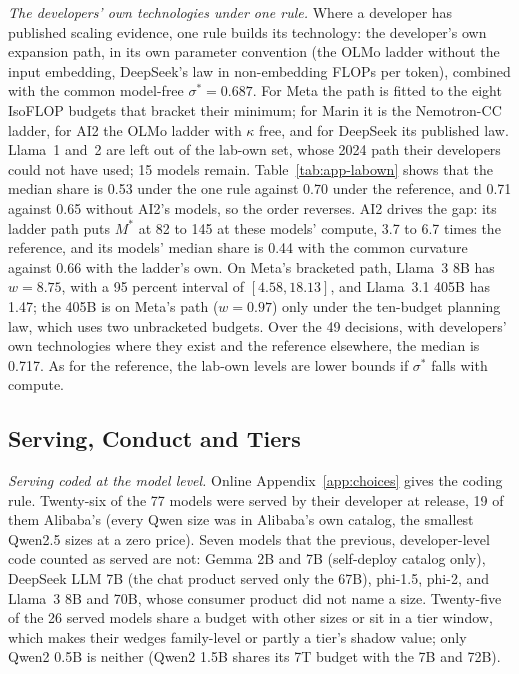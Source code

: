 \textit{The developers' own technologies under one rule.} Where a developer has published scaling evidence, one rule
builds its technology: the developer's own expansion path, in its own parameter convention (the OLMo ladder without the
input embedding, DeepSeek's law in non-embedding FLOPs per token), combined with the common model-free $\sigma^*=0.687$.
For Meta the path is fitted to the eight IsoFLOP budgets that bracket their minimum; for Marin it is the Nemotron-CC
ladder, for AI2 the OLMo ladder with $\kappa$ free, and for DeepSeek its published law. Llama~1 and~2 are left out of the
lab-own set, whose 2024 path their developers could not have used; 15 models remain. Table~\ref{tab:app-labown} shows that
the median share is 0.53 under the one rule against 0.70 under the reference, and 0.71 against 0.65 without AI2's models,
so the order reverses. AI2 drives the gap: its ladder path puts $M^*$ at 82 to 145 at these models' compute, 3.7 to 6.7
times the reference, and its models' median share is 0.44 with the common curvature against 0.66 with the ladder's own.
On Meta's bracketed path, Llama~3 8B has $w=8.75$, with a 95 percent interval of $[4.58,18.13]$, and Llama~3.1 405B has
1.47; the 405B is on Meta's path ($w=0.97$) only under the ten-budget planning law, which uses two unbracketed budgets.
Over the 49 decisions, with developers' own technologies where they exist and the reference elsewhere, the median is
0.717. As for the reference, the lab-own levels are lower bounds if $\sigma^*$ falls with compute.




\subsection{Serving, Conduct and Tiers}\label{app:wedge-conduct}

\textit{Serving coded at the model level.} Online Appendix~\ref{app:choices} gives the coding rule. Twenty-six of the 77
models were served by their developer at release, 19 of them Alibaba's (every Qwen size was in Alibaba's own catalog, the
smallest Qwen2.5 sizes at a zero price). Seven models that the previous, developer-level code counted as served are not:
Gemma 2B and 7B (self-deploy catalog only), DeepSeek LLM 7B (the chat product served only the 67B), phi-1.5, phi-2, and
Llama~3 8B and 70B, whose consumer product did not name a size. Twenty-five of the 26 served models share a budget with
other sizes or sit in a tier window, which makes their wedges family-level or partly a tier's shadow value; only Qwen2
0.5B is neither (Qwen2 1.5B shares its 7T budget with the 7B and 72B).

